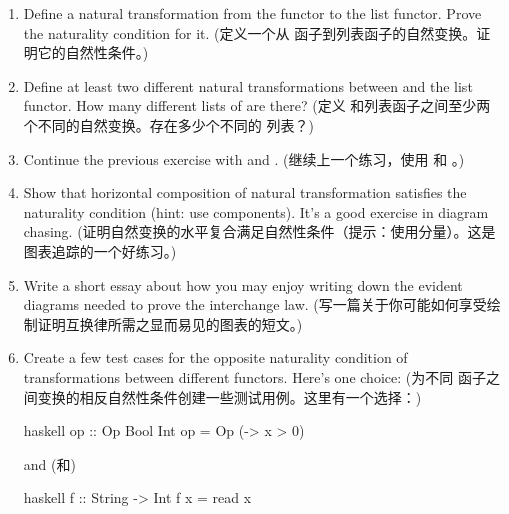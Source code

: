 \begin{enumerate}
  \tightlist
  \item
        Define a natural transformation from the  functor to the list functor. Prove the naturality condition for it. (定义一个从  函子到列表函子的自然变换。证明它的自然性条件。)
  \item
        Define at least two different natural transformations between  and the list functor. How many different lists of \code{()} are there? (定义  和列表函子之间至少两个不同的自然变换。存在多少个不同的 \code{()} 列表？)
  \item
        Continue the previous exercise with  and . (继续上一个练习，使用  和 。)
  \item
        Show that horizontal composition of natural transformation satisfies the naturality condition (hint: use components). It's a good exercise in diagram chasing. (证明自然变换的水平复合满足自然性条件（提示：使用分量）。这是图表追踪的一个好练习。)
  \item
        Write a short essay about how you may enjoy writing down the evident diagrams needed to prove the interchange law. (写一篇关于你可能如何享受绘制证明互换律所需之显而易见的图表的短文。)
  \item
        Create a few test cases for the opposite naturality condition of transformations between different  functors. Here's one choice: (为不同  函子之间变换的相反自然性条件创建一些测试用例。这里有一个选择：)

        \begin{snip}{haskell}
op :: Op Bool Int
op = Op (\x -> x > 0)
\end{snip}
        and (和)

        \begin{snip}{haskell}
f :: String -> Int
f x = read x
\end{snip}
\end{enumerate}